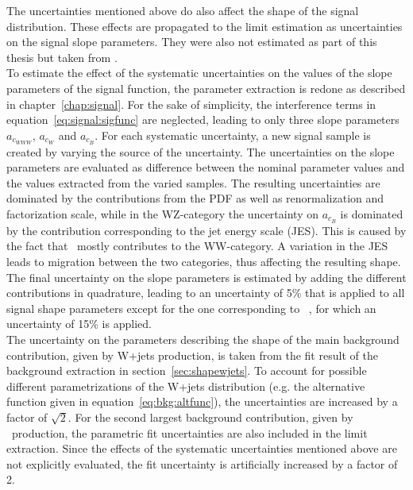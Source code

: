 The uncertainties mentioned above do also affect the shape of the signal distribution. These effects are propagated to the limit estimation as uncertainties on the signal slope parameters. They were also not estimated as part of this thesis but taken from \cite{PAS}.\\

\noindent To estimate the effect of the systematic uncertainties on the values of the slope parameters of the signal function, the parameter extraction is redone as described in chapter~\ref{chap:signal}. For the sake of simplicity, the interference terms in equation~\ref{eq:signal:sigfunc} are neglected, leading to only three slope parameters $a_{c_{WWW}}$, $a_{c_W}$ and $a_{c_B}$. For each systematic uncertainty, a new signal sample is created by varying the source of the uncertainty. The uncertainties on the slope parameters are evaluated as difference between the nominal parameter values and the values extracted from the varied samples. The resulting uncertainties are dominated by the contributions from the PDF as well as renormalization and factorization scale, while in the WZ-category the uncertainty on $a_{c_B}$ is dominated by the contribution corresponding to the jet energy scale (JES). This is caused by the fact that \Tcb \ mostly contributes to the WW-category. A variation in the JES leads to migration between the two categories, thus affecting the resulting shape.\\

\noindent The final uncertainty on the slope parameters is estimated by adding the different contributions in quadrature, leading to an uncertainty of 5\% that is applied to all signal shape parameters except for the one corresponding to \Tcb \ , for which an uncertainty of 15\% is applied.\\

\noindent The uncertainty on the parameters describing the shape of the main background contribution, given by W+jets production, is taken from the fit result of the background extraction in section~\ref{sec:shapewjets}. To account for possible different parametrizations of the W+jets distribution (e.g. the alternative function given in equation~\ref{eq:bkg:altfunc}), the uncertainties are increased by a factor of $\sqrt{2}$. For the second largest background contribution, given by \ttbar \ production, the parametric fit uncertainties are also included in the limit extraction. Since the effects of the systematic uncertainties mentioned above are not explicitly evaluated, the fit uncertainty is artificially increased by a factor of 2.


